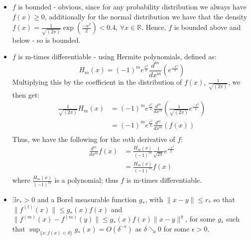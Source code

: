 \documentclass[12pt]{report}
\begin{document}
\begin{itemize}
\item $f$ is bounded - obvious, since for any probability distribution we always have $f(x) \geq 0$, additionally for the normal distribution we have that the density $f(x) = \frac{1}{\sqrt{(2\pi)}} \exp{ \left( \frac{-x^2}{2} \right)} < 0.4$, $\forall x \in \mathbb{R}$. Hence, $f$ is bounded above and below - so is bounded.

\item $f$ is m-times differentiable - using Hermite polynomials, defined as:
\begin{equation}
H_{m}(x) = (-1)^m e^{\frac{x^2}{2}} \frac{d^m}{dx^m} \left(e^{\frac{-x^2}{2}} \right) \nonumber
\end{equation}
Multiplying this by the coefficient in the distribution of $f(x)$, $\frac{1}{\sqrt{(2 \pi)}}$, we then get:
\begin{align*}
\frac{1}{\sqrt{(2 \pi)}} H_{m}(x) &= (-1)^m e^{\frac{x^2}{2}} \frac{d^m}{dx^m} \left(\frac{1}{\sqrt{(2 \pi)}} e^{\frac{-x^2}{2}} \right) \nonumber\\
&= (-1)^m e^{\frac{x^2}{2}} \frac{d^m}{dx^m} \left(f(x) \right) \nonumber\\
\end{align*}
Thus, we have the following for the $m$th derivative of $f$:
\begin{align*}
 \frac{d^m}{dx^m} f(x) &= \frac{H_{m}(x)}{(-1)^m} \frac{1}{\sqrt{2 \pi}} e^{\frac{-x^2}{2}} \\ 
&= \frac{H_{m}(x)}{(-1)^m} f(x) 
\end{align*}
where $\frac{H_{m}(x)}{(-1)^m}$ is a polynomial; thus $f$ is m-times differentiable.

\item $\exists r_{*} > 0$ and a Borel measurable function $g_{*}$, with $\|x-y\| \leq r_{*}$ so that $\|f^{(t)}(x)\| \leq g_{*}(x) f(x)$ and $\|f^{(m)}(x) - f^{(m)}(y)\| \leq g_{*}(x) f(x)\|x-y\|^{\eta}$, for some $g_{*}$ such that $\sup_{\{x : f(x) < \delta\}} g_{*}(x) = O(\delta^{-\epsilon})$ as $\delta \searrow 0$ for some $\epsilon >0$. 


\end{itemize}
\end{document}
